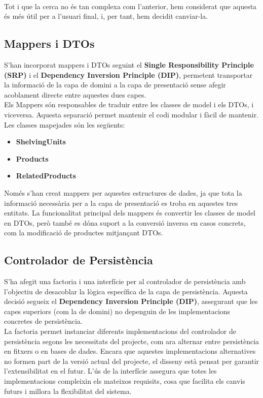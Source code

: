 \documentclass[a4paper,12pt]{report}
\begin{document}
\

Tot i que la cerca no és tan complexa com l'anterior, hem considerat que aquesta és més útil per a l'usuari final, i, per tant, hem decidit canviar-la.

\subsection{Mappers i DTOs}
S'han incorporat mappers i DTOs seguint el \textbf{Single Responsibility Principle (SRP)} i el \textbf{Dependency Inversion Principle (DIP)}, permetent transportar la informació de la capa de domini a la capa de presentació sense afegir acoblament directe entre aquestes dues capes.\\

Els Mappers són responsables de traduir entre les classes de model i els DTOs, i viceversa. Aquesta separació permet mantenir el codi modular i fàcil de mantenir. Les classes mapejades són les següents:
\begin{itemize}
	\item \textbf{ShelvingUnits}
	\item \textbf{Products}
	\item \textbf{RelatedProducts}
\end{itemize}
Només s'han creat mappers per aquestes estructures de dades, ja que tota la informació necessària per a la capa de presentació es troba en aquestes tres entitats. La funcionalitat principal dels mappers és convertir les classes de model en DTOs, però també es dóna suport a la conversió inversa en casos concrets, com la modificació de productes mitjançant DTOs.

\subsection{Controlador de Persistència}
S'ha afegit una factoria i una interfície per al controlador de persistència amb l'objectiu de desacoblar la lògica específica de la capa de persistència. Aquesta decisió segueix el \textbf{Dependency Inversion Principle (DIP)}, assegurant que les capes superiors (com la de domini) no depenguin de les implementacions concretes de persistència.\\

La factoria permet instanciar diferents implementacions del controlador de persistència segons les necessitats del projecte, com ara alternar entre persistència en fitxers o en bases de dades. Encara que aquestes implementacions alternatives no formen part de la versió actual del projecte, el disseny està pensat per garantir l'extensibilitat en el futur. L'ús de la interfície assegura que totes les implementacions compleixin els mateixos requisits, cosa que facilita els canvis futurs i millora la flexibilitat del sistema.
\end{document}
